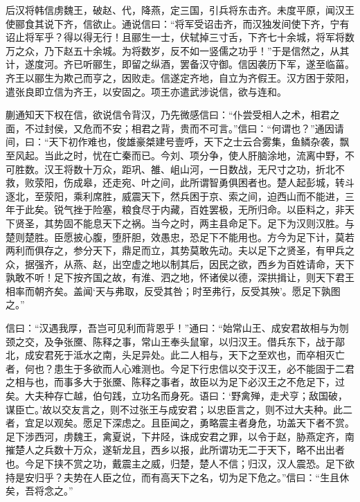 \documentclass[12pt,UTF8]{ctexbook}
\begin{document}
后汉将韩信虏魏王，破赵、代，降燕，定三国，引兵将东击齐。未度平原，闻汉王使郦食其说下齐，信欲止。通说信曰：“将军受诏击齐，而汉独发间使下齐，宁有诏止将军乎？得以得无行！且郦生一士，伏轼掉三寸舌，下齐七十余城，将军将数万之众，乃下赵五十余城。为将数岁，反不如一竖儒之功乎！”于是信然之，从其计，遂度河。齐已听郦生，即留之纵酒，罢备汉守御。信因袭历下军，遂至临菑。齐王以郦生为欺己而亨之，因败走。信遂定齐地，自立为齐假王。汉方困于荥阳，遣张良即立信为齐王，以安固之。项王亦遣武涉说信，欲与连和。



蒯通知天下权在信，欲说信令背汉，乃先微感信曰：“仆尝受相人之术，相君之面，不过封侯，又危而不安；相君之背，贵而不可言。”信曰：“何谓也？”通因请间，曰：“天下初作难也，俊雄豪桀建号壹呼，天下之士云合雾集，鱼鳞杂袭，飘至风起。当此之时，忧在亡秦而已。今刘、项分争，使人肝脑涂地，流离中野，不可胜数。汉王将数十万众，距巩、雒、岨山河，一日数战，无尺寸之功，折北不救，败荥阳，伤成皋，还走宛、叶之间，此所谓智勇俱困者也。楚人起彭城，转斗逐北，至荥阳，乘利席胜，威震天下，然兵困于京、索之间，迫西山而不能进，三年于此矣。锐气挫于险塞，粮食尽于内藏，百姓罢极，无所归命。以臣料之，非天下贤圣，其势固不能息天下之祸。当今之时，两主县命足下。足下为汉则汉胜。与楚则楚胜。臣愿披心腹，堕肝胆，效愚忠，恐足下不能用也。方今为足下计，莫若两利而俱存之，参分天下，鼎足而立，其势莫敢先动。夫以足下之贤圣，有甲兵之众，据强齐，从燕、赵，出空虚之地以制其后，因民之欲，西乡为百姓请命，天下孰敢不听！足下按齐国之故，有淮、泗之地，怀诸侯以德，深拱揖让，则天下君王相率而朝齐矣。盖闻‘天与弗取，反受其咎；时至弗行，反受其殃’。愿足下孰图之。”



信曰：“汉遇我厚，吾岂可见利而背恩乎！”通曰：“始常山王、成安君故相与为刎颈之交，及争张黡、陈释之事，常山王奉头鼠窜，以归汉王。借兵东下，战于鄗北，成安君死于泜水之南，头足异处。此二人相与，天下之至欢也，而卒相灭亡者，何也？患生于多欲而人心难测也。今足下行忠信以交于汉王，必不能固于二君之相与也，而事多大于张黡、陈释之事者，故臣以为足下必汉王之不危足下，过矣。大夫种存亡越，伯句践，立功名而身死。语曰：‘野禽殚，走犬亨；敌国破，谋臣亡。’故以交友言之，则不过张王与成安君；以忠臣言之，则不过大夫种。此二者，宜足以观矣。愿足下深虑之。且臣闻之，勇略震主者身危，功盖天下者不赏。足下涉西河，虏魏王，禽夏说，下井陉，诛成安君之罪，以令于赵，胁燕定齐，南摧楚人之兵数十万众，遂斩龙且，西乡以报，此所谓功无二于天下，略不出出者也。今足下挟不赏之功，戴震主之威，归楚，楚人不信；归汉，汉人震恐。足下欲持是安归乎？夫势在人臣之位，而有高天下之名，切为足下危之。”信曰：“生且休矣，吾将念之。”
\end{document}

